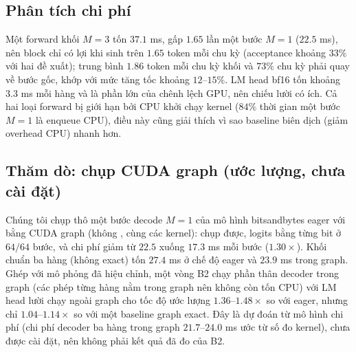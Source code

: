 \subsection{Phân tích chi phí}
Một forward khối $M{=}3$ tốn $37.1$ ms, gấp $1.65$ lần một bước $M{=}1$ ($22.5$ ms), nên block chỉ có lợi khi sinh trên $1.65$ token mỗi chu kỳ (acceptance khoảng $33\%$ với hai đề xuất); trung bình $1.86$ token mỗi chu kỳ khối và $73\%$ chu kỳ phải quay về bước gốc, khớp với mức tăng tốc khoảng $12$--$15\%$. LM head bf16 tốn khoảng $3.3$ ms mỗi hàng và là phần lớn của chênh lệch GPU, nên chiếu lười có ích. Cả hai loại forward bị giới hạn bởi CPU khởi chạy kernel ($84\%$ thời gian một bước $M{=}1$ là enqueue CPU), điều này cũng giải thích vì sao baseline biên dịch (giảm overhead CPU) nhanh hơn.

\subsection{Thăm dò: chụp CUDA graph (ước lượng, chưa cài đặt)}
Chúng tôi chụp thô một bước decode $M{=}1$ của mô hình bitsandbytes eager với  bằng CUDA graph (không , cùng các kernel): chụp được, logits bằng từng bit ở $64/64$ bước, và chi phí giảm từ $22.5$ xuống $17.3$ ms mỗi bước ($1.30\times$). Khối chuẩn ba hàng (không exact) tốn $27.4$ ms ở chế độ eager và $23.9$ ms trong graph. Ghép với mô phỏng đã hiệu chỉnh, một vòng B2 chạy phần thân decoder trong graph (các phép từng hàng nằm trong graph nên không còn tốn CPU) với LM head lười chạy ngoài graph cho tốc độ ước lượng $1.36$--$1.48\times$ so với eager, nhưng chỉ $1.04$--$1.14\times$ so với một baseline graph exact. Đây là dự đoán từ mô hình chi phí (chi phí decoder ba hàng trong graph $21.7$--$24.0$ ms ước từ số đo kernel), chưa được cài đặt, nên không phải kết quả đã đo của B2.

